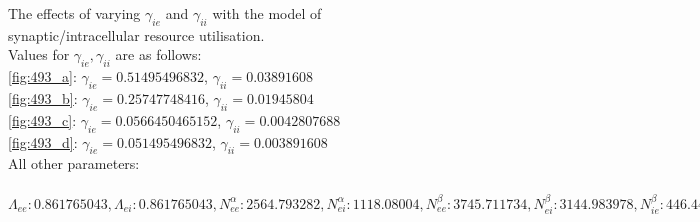 \documentclass[a4paper,12pt]{article}
\begin{document}
\begin{figure}
	\caption{The effects of varying $\gamma_{ie}$ and $\gamma_{ii}$ with the model of synaptic/intracellular resource utilisation. \\
	Values for $\gamma_{ie}, \gamma_{ii}$ are as follows: \\
\ref{fig:493_a}: $\gamma_{ie}=0.51495496832$, $\gamma_{ii}=0.03891608$ \\
\ref{fig:493_b}: $\gamma_{ie}=0.25747748416$, $\gamma_{ii}=0.01945804$ \\
\ref{fig:493_c}: $\gamma_{ie}=0.0566450465152$, $\gamma_{ii}=0.0042807688$ \\
\ref{fig:493_d}: $\gamma_{ie}=0.051495496832$, $\gamma_{ii}=0.003891608$ \\
All other parameters:\\ \\
$\Lambda_{ee}: 0.861765043, \Lambda_{ei}: 0.861765043, N^{\alpha}_{ee}: 2564.793282, N^{\alpha}_{ei}: 1118.08004, N^{\beta}_{ee}: 3745.711734, N^{\beta}_{ei}: 3144.983978, N^{\beta}_{ie}: 446.4477283, N^{\beta}_{ii}: 345.8866865, \Gamma_{ee}: 1.6861042005, \Gamma_{ei}: 1.885871361, \Gamma_{ie}: 5.855116285, \Gamma_{ii}: 6.9331585350000005, g: 0.7, \gamma_{ee}: 0.95083473, \gamma_{ei}: 0.79156622, \chi_{ee}: 700.0, \chi_{ei}: 700.0, h^{rest}_e: -79.61058688, h^{eq}_{ee}: -17.9914286, h^{eq}_{ei}: -15.53827744, h^{rest}_i: -71.24328917, h^{eq}_{ie}: -84.00936425, h^{eq}_{ii}: -89.797995, \mu_e: -41.12042539, \mu_i: -54.45064422, p_{ee}: 2.6864898634, p_{ei}: 6.648040185, p_{ie}: 0.0, p_{ii}: 0.0, \phi_{ie}: 0, \phi_{ii}: 0, r^{abs}: 0.0, S^{max}_e: 0.400558, S^{max}_i: 0.404191, \sigma_e: 6.55747395, \sigma_i: 2.047597811, \tau_e: 108.758, \tau_i: 232.0, \tau^{slow}_e: 5437.9, v: 0.419426$
}
\end{figure}
\end{document}

